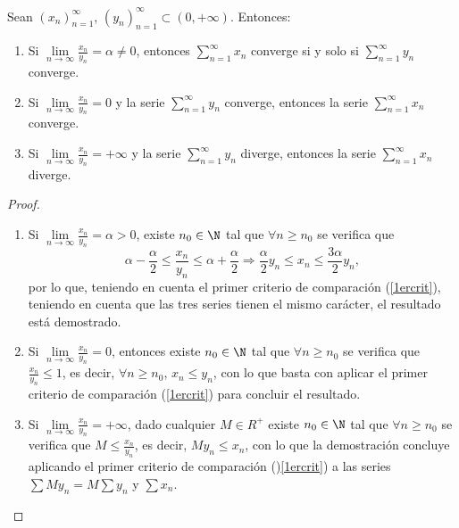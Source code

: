\begin{theorem}
	Sean \((x_n)^{\infty}_{n=1} \), \((y_n)^{\infty}_{n=1} \subset (0,+\infty) \). Entonces:
	\begin{enumerate}
		\item Si \(\lim\limits_{n \to \infty} \frac{x_n }{y_n } = \alpha \neq 0 \), entonces \(\sum_{n=1}^{\infty} x_n \) converge si y solo si \(\sum_{n=1}^{\infty} y_n \) converge.
		\item Si \(\lim\limits_{n \to \infty} \frac{x_n }{y_n }= 0 \) y la serie \(\sum_{n=1}^{\infty} y_n \) converge, entonces la serie \(\sum_{n =1}^{\infty} x_n \) converge.
		\item Si \(\lim\limits_{n \to \infty} \frac{x_n }{y_n }= + \infty \) y la serie \(\sum_{n =1}^{\infty} y_n \) diverge, entonces la serie \(\sum_{n =1}^{\infty} x_n \) diverge.
	\end{enumerate}
\end{theorem}
\begin{proof}

	\begin{enumerate}
		\item Si \(\lim\limits_{n \to \infty} \frac{x_n }{y_n } = \alpha > 0\), existe \(n_0 \in \N\) tal que \(\forall n \geq n_0\) se verifica que
		      \[
			      \alpha - \frac{\alpha}{2} \leq \frac{x_n }{y_n } \leq \alpha + \frac{\alpha}{2} \Rightarrow \frac{\alpha}{2} y_n \leq x_n \leq \frac{3\alpha}{2} y_n,
		      \]
		      por lo que, teniendo en cuenta el primer criterio de comparación (\ref{1ercrit}), teniendo en cuenta que las tres series tienen el mismo carácter, el resultado está demostrado. 
		\item Si \(\lim\limits_{n \to \infty} \frac{x_n }{y_n } = 0\), entonces existe \(n_0 \in \N\) tal que \(\forall n \geq n_0 \) se verifica que \(\frac{x_n }{y_n} \leq 1\), es decir, \(\forall n \geq n_0\), \(x_n \leq y_n\), con lo que basta con aplicar el primer criterio de comparación (\ref{1ercrit}) para concluir el resultado.
		\item Si \(\lim\limits_{n \to \infty} \frac{x_n }{y_n } = +\infty\), dado cualquier \(M \in R^{+}\) existe \(n_0 \in \N \) tal que \(\forall n \geq  n_0\) se verifica que \(M \leq \frac{x_n }{y_n }\), es decir, \(My_n \leq x_n \), con lo que la demostración concluye aplicando el primer criterio de comparación ()\ref{1ercrit}) a las series \(\sum M y_n = M \sum y_n \) y \(\sum x_n\).
	\end{enumerate}
\end{proof}
